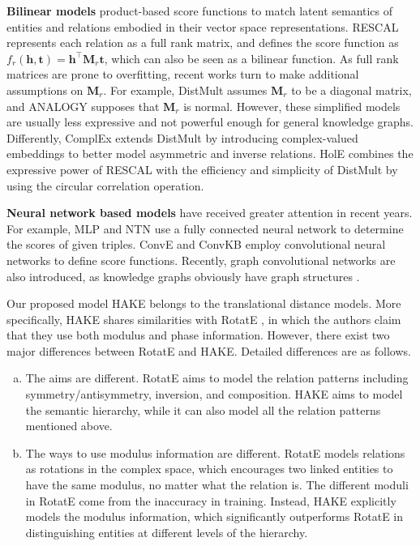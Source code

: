\documentclass[letterpaper]{article} \usepackage{aaai20}  \usepackage{times}  \usepackage{helvet} \usepackage{courier}  \usepackage[hyphens]{url}  \usepackage{graphicx} \urlstyle{rm} \def\UrlFont{\rm}  \usepackage{graphicx}  \frenchspacing  \setlength{\pdfpagewidth}{8.5in}  \setlength{\pdfpageheight}{11in}
\newcommand{\citep}{\cite}
\begin{document}
\textbf{Bilinear models} product-based score functions to match latent semantics of entities and relations embodied in their vector space representations. RESCAL \citep{rescal} represents each relation as a full rank matrix, and defines the score function as $f_r(\textbf{h},\textbf{t})=\textbf{h}^\top \textbf{M}_r \textbf{t}$, which can also be seen as a bilinear function. As full rank matrices are prone to overfitting, recent works turn to make additional assumptions on $\textbf{M}_r$. For example, DistMult \citep{distmult} assumes $\textbf{M}_r$ to be a diagonal matrix, and ANALOGY \citep{analogy} supposes that $\textbf{M}_r$ is normal. However, these simplified models are usually less expressive and not powerful enough for general knowledge graphs. Differently, ComplEx \citep{complex} extends DistMult by introducing complex-valued embeddings to better model asymmetric and inverse relations. HolE \citep{hole} combines the expressive power of RESCAL with the efficiency and simplicity of DistMult by using the circular correlation operation.

\textbf{Neural network based models} have received greater attention in recent years. For example, MLP \citep{mlp} and NTN \citep{ntn} use a fully connected neural network to determine the scores of given triples.  ConvE \citep{conve} and ConvKB \citep{convkb} employ convolutional neural networks to define score functions. Recently, graph convolutional networks are also introduced, as knowledge graphs obviously have graph structures \citep{rgcn}. 

Our proposed model HAKE belongs to the translational distance models. More specifically, HAKE shares similarities with RotatE \citep{rotate}, in which the authors claim that they use both modulus and phase information. However, there exist two major differences between RotatE and HAKE. Detailed differences are as follows.
\begin{enumerate}[(a)]
    \item The aims are different. RotatE aims to model the relation patterns including symmetry/antisymmetry, inversion, and composition. HAKE aims to model the semantic hierarchy, while it can also model all the relation patterns mentioned above.
    \item The ways to use modulus information are different. RotatE models relations as rotations in the complex space, which encourages two linked entities to have the same modulus, no matter what the relation is. The different moduli in RotatE come from the inaccuracy in training. Instead, HAKE explicitly models the modulus information, which significantly outperforms RotatE in distinguishing entities at different levels of the hierarchy.
\end{enumerate} 
\end{document}
